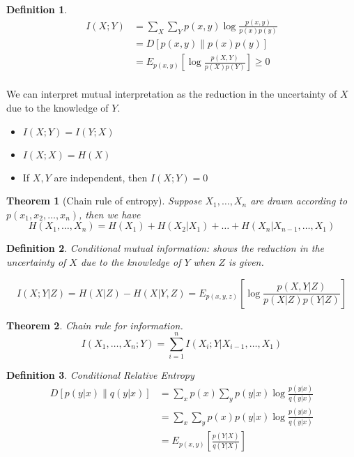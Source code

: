 \documentclass[10pt,landscape, a4paper]{article}
\newtheorem{definition}{Definition}
\newtheorem{theorem}{Theorem}
\begin{document}
\begin{multicols}{3}
\begin{definition}
    $$
    \begin{aligned}
        I(X;Y)&=\sum_X\sum_Y p(x,y)\log\frac{p(x,y)}{p(x)p(y)}\\
        &=D[p(x,y)\parallel p(x)p(y)]\\
        &=E_{p(x,y)}\left[\log\frac{p(X,Y)}{p(X)p(Y)}\right]\ge0\\
    \end{aligned}
    $$
\end{definition}

We can interpret mutual interpretation as the reduction in the uncertainty of $X$ due to the knowledge of $Y$.
\begin{itemize}
    \item $I(X;Y)=I(Y;X)$
    \item $I(X;X)=H(X)$
    \item If $X,Y$ are independent, then $I(X;Y)=0$
\end{itemize}

\begin{theorem}[Chain rule of entropy]
    Suppose $X_1, \dots, X_n$ are drawn according to $p(x_1,x_2,\dots, x_n)$, then we have
    $$
    H(X_1, \dots, X_n)=H(X_1)+H(X_2|X_1)+\dots + H(X_n|X_{n-1},\dots, X_1)
    $$
\end{theorem}

\begin{definition}
    Conditional mutual information: shows the reduction in the uncertainty of $X$ due to the knowledge of $Y$ when $Z$ is given.

    $$
    I(X;Y|Z)=H(X|Z)-H(X|Y,Z)=E_{p(x,y,z)}\left[\log \frac{p(X,Y|Z)}{p(X|Z)p(Y|Z)}\right]
    $$
\end{definition}

\begin{theorem}
    Chain rule for information.
    $$
    I(X_1,\dots, X_n;Y)=\sum_{i=1}^n I(X_i;Y|X_{i-1},\dots, X_1)
    $$
\end{theorem}

\begin{definition}
    Conditional Relative Entropy
    $$
    \begin{aligned}
        D[p(y|x)\parallel q(y|x)]&=\sum_x p(x)\sum_y p(y|x)\log\frac{p(y|x)}{q(y|x)}\\
        &=\sum_x\sum_y p(x)p(y|x)\log\frac{p(y|x)}{q(y|x)}\\
        &=E_{p(x,y)}\left[\frac{p(Y|X)}{q(Y|X)}\right]\\
    \end{aligned}
    $$
\end{definition}


\end{multicols}
\end{document}
